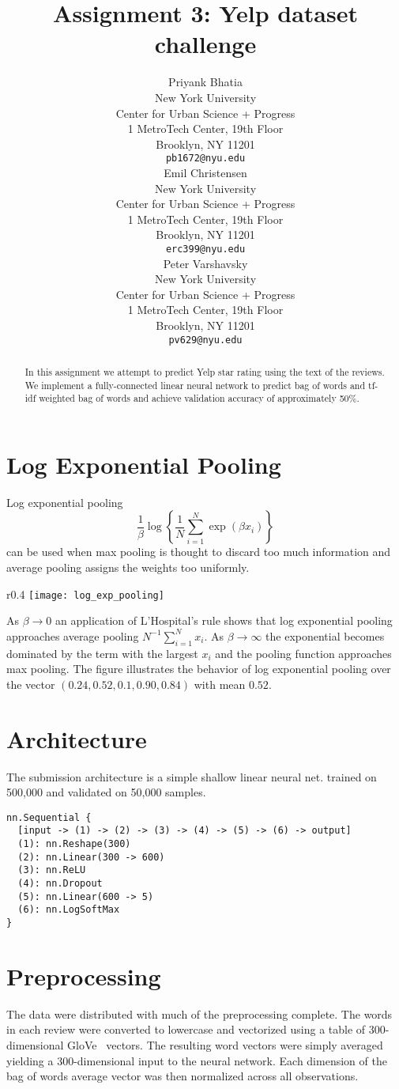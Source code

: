 \documentclass{article} %
\title{Assignment 3: Yelp dataset challenge}
\author{
Priyank Bhatia \\
New York University \\
Center for Urban Science + Progress \\
1 MetroTech Center, 19th Floor \\
Brooklyn, NY 11201 \\
\texttt{pb1672@nyu.edu} \\
\AND
Emil Christensen \\
New York University \\
Center for Urban Science + Progress \\
1 MetroTech Center, 19th Floor \\
Brooklyn, NY 11201 \\
\texttt{erc399@nyu.edu} \\
\And
Peter Varshavsky \\
New York University \\
Center for Urban Science + Progress \\
1 MetroTech Center, 19th Floor \\
Brooklyn, NY 11201 \\
\texttt{pv629@nyu.edu} \\
}
\begin{document}
\maketitle


\begin{abstract}
In this assignment we attempt to predict Yelp star rating using the text of the reviews. We implement a fully-connected linear neural network to predict bag of words and tf-idf weighted bag of words and achieve validation accuracy of approximately 50\%.\end{abstract}

\section{Log Exponential Pooling}
Log exponential pooling
\[
\frac{1}{\beta}\log\left\{
	\frac{1}{N}
	\sum_{i=1}^N
	\exp\left(\beta x_i \right)
	\right\}
\]
can be used when max pooling is thought to discard too much information and average pooling assigns the weights too uniformly.
\begin{wrapfigure}{r}{0.4\textwidth}
\texttt{[image: log\_exp\_pooling]}
\end{wrapfigure}
As $\beta \rightarrow 0$ an application of L'Hospital's rule shows that log exponential pooling approaches average pooling $N^{-1}\sum_{i=1}^N x_i$.
As $\beta \rightarrow \infty$ the exponential becomes dominated by the term with the largest $x_i$ and the pooling function approaches max pooling.
The figure illustrates the behavior of log exponential pooling over the vector $(0.24, 0.52, 0.1, 0.90, 0.84)$ with mean $0.52$.

\section{Architecture}
\label{arc}

The submission architecture is a simple shallow linear neural net. trained on 500,000 and validated on 50,000 samples.
\begin{lstlisting}
nn.Sequential {
  [input -> (1) -> (2) -> (3) -> (4) -> (5) -> (6) -> output]
  (1): nn.Reshape(300)
  (2): nn.Linear(300 -> 600)
  (3): nn.ReLU
  (4): nn.Dropout
  (5): nn.Linear(600 -> 5)
  (6): nn.LogSoftMax
}

\end{lstlisting}

\section{Preprocessing}
\label{preproc}
The data were distributed with much of the preprocessing complete.
The words in each review were converted to lowercase and vectorized using a table of 300-dimensional GloVe~\cite{pennington14} vectors.
The resulting word vectors were simply averaged yielding a 300-dimensional input to the neural network. Each dimension of the bag of words average vector was then normalized across all observations.
\end{document}
